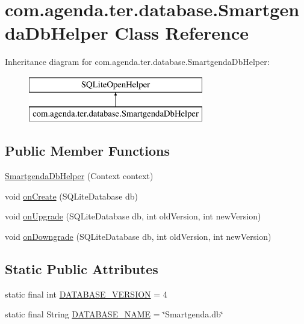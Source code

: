 \hypertarget{classcom_1_1agenda_1_1ter_1_1database_1_1_smartgenda_db_helper}{\section{com.\-agenda.\-ter.\-database.\-Smartgenda\-Db\-Helper Class Reference}
\label{classcom_1_1agenda_1_1ter_1_1database_1_1_smartgenda_db_helper}
}
Inheritance diagram for com.\-agenda.\-ter.\-database.\-Smartgenda\-Db\-Helper\-:\begin{figure}[H]
\begin{center}
\leavevmode
\includegraphics[height=2.000000cm]{classcom_1_1agenda_1_1ter_1_1database_1_1_smartgenda_db_helper}
\end{center}
\end{figure}
\subsection*{Public Member Functions}
\begin{DoxyCompactItemize}
\item 
\hyperlink{classcom_1_1agenda_1_1ter_1_1database_1_1_smartgenda_db_helper_ae9a70af121e8805dd9a69eb99983f3ae}{Smartgenda\-Db\-Helper} (Context context)
\item 
void \hyperlink{classcom_1_1agenda_1_1ter_1_1database_1_1_smartgenda_db_helper_a3f78365dfb20c3b8aa38ae825dc6bdc8}{on\-Create} (S\-Q\-Lite\-Database db)
\item 
void \hyperlink{classcom_1_1agenda_1_1ter_1_1database_1_1_smartgenda_db_helper_a159ea002a9510a4d8e9da5927e244124}{on\-Upgrade} (S\-Q\-Lite\-Database db, int old\-Version, int new\-Version)
\item 
void \hyperlink{classcom_1_1agenda_1_1ter_1_1database_1_1_smartgenda_db_helper_ac6cf156483a29caaea255b5e57b25140}{on\-Downgrade} (S\-Q\-Lite\-Database db, int old\-Version, int new\-Version)
\end{DoxyCompactItemize}
\subsection*{Static Public Attributes}
\begin{DoxyCompactItemize}
\item 
static final int \hyperlink{classcom_1_1agenda_1_1ter_1_1database_1_1_smartgenda_db_helper_a0e1c44acf581ed313f8cd46529a91a72}{D\-A\-T\-A\-B\-A\-S\-E\-\_\-\-V\-E\-R\-S\-I\-O\-N} = 4
\item 
static final String \hyperlink{classcom_1_1agenda_1_1ter_1_1database_1_1_smartgenda_db_helper_a39d4c02437c5005d4149a17c32e63edd}{D\-A\-T\-A\-B\-A\-S\-E\-\_\-\-N\-A\-M\-E} = \char`\"{}Smartgenda.\-db\char`\"{}
\end{DoxyCompactItemize}


